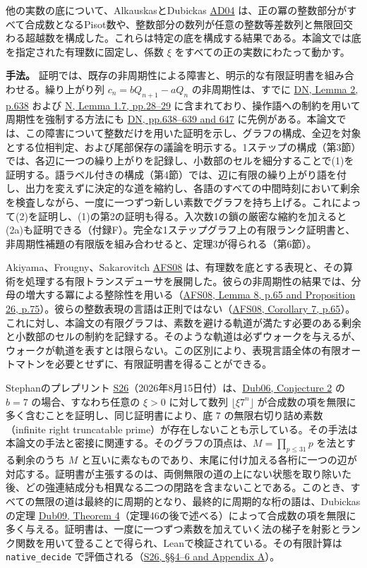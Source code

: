 \documentclass[11pt,reqno]{amsart}
\theoremstyle{definition}
\theoremstyle{definition}
\theoremstyle{remark}
\begin{document}
他の実数の底について、AlkauskasとDubickas \hyperref[ref-ad04]{AD04} は、正の冪の整数部分がすべて合成数となるPisot数や、整数部分の数列が任意の整数等差数列と無限回交わる超越数を構成した。これらは特定の底を構成する結果である。本論文では底を指定された有理数に固定し、係数 \(\xi\) をすべての正の実数にわたって動かす。

\textbf{手法。} 証明では、既存の非周期性による障害と、明示的な有限証明書を組み合わせる。繰り上がり列 \(c_n=bQ_{n+1}-aQ_n\) の非周期性は、すでに \hyperref[ref-dn]{DN, Lemma 2, p.638} および \hyperref[ref-n]{N, Lemma 1.7, pp.28--29} に含まれており、操作語への制約を用いて周期性を強制する方法にも \hyperref[ref-dn]{DN, pp.638--639 and 647} に先例がある。本論文では、この障害について整数だけを用いた証明を示し、グラフの構成、全辺を対象とする位相判定、および尾部保存の議論を明示する。1ステップの構成（第3節）では、各辺に一つの繰り上がりを記録し、小数部のセルを細分することで(1)を証明する。語ラベル付きの構成（第4節）では、辺に有限の繰り上がり語を付し、出力を変えずに決定的な道を縮約し、各語のすべての中間時刻において剰余を検査しながら、一度に一つずつ新しい素数でグラフを持ち上げる。これによって(2)を証明し、(1)の第2の証明も得る。入次数1の鎖の厳密な縮約を加えると(2a)も証明できる（付録F）。完全な1ステップグラフ上の有限ランク証明書と、非周期性補題の有限版を組み合わせると、定理3が得られる（第6節）。

Akiyama、Frougny、Sakarovitch \hyperref[ref-afs08]{AFS08} は、有理数を底とする表現と、その算術を処理する有限トランスデューサを展開した。彼らの非周期性の結果では、分母の増大する冪による整除性を用いる（\hyperref[ref-afs08]{AFS08, Lemma 8, p.65 and Proposition 26, p.75}）。彼らの整数表現の言語は正則ではない（\hyperref[ref-afs08]{AFS08, Corollary 7, p.65}）。これに対し、本論文の有限グラフは、素数を避ける軌道が満たす必要のある剰余と小数部のセルの制約を記録する。そのような軌道は必ずウォークを与えるが、ウォークが軌道を表すとは限らない。この区別により、表現言語全体の有限オートマトンを必要とせずに、有限証明書を得ることができる。

Stephanのプレプリント \hyperref[ref-s26]{S26}（2026年8月15日付）は、\hyperref[ref-dub06]{Dub06, Conjecture 2} の \(b=7\) の場合、すなわち任意の \(\xi>0\) に対して数列 \(\lfloor\xi7^n\rfloor\) が合成数の項を無限に多く含むことを証明し、同じ証明書により、底 \(7\) の無限右切り詰め素数（infinite right truncatable prime）が存在しないことも示している。その手法は本論文の手法と密接に関連する。そのグラフの頂点は、\(M=\prod_{p\le31}p\) を法とする剰余のうち \(M\) と互いに素なものであり、末尾に付け加える各桁に一つの辺が対応する。証明書が主張するのは、両側無限の道の上にない状態を取り除いた後、どの強連結成分も相異なる二つの閉路を含まないことである。このとき、すべての無限の道は最終的に周期的となり、最終的に周期的な桁の語は、Dubickasの定理 \hyperref[ref-dub09]{Dub09, Theorem 4}（定理46の後で述べる）によって合成数の項を無限に多く与える。証明書は、一度に一つずつ素数を加えていく法の梯子を射影とランク関数を用いて登ることで得られ、Leanで検証されている。その有限計算は \nolinkurl{native_decide} で評価される（\hyperref[ref-s26]{S26, §§4--6 and Appendix A}）。
\end{document}
